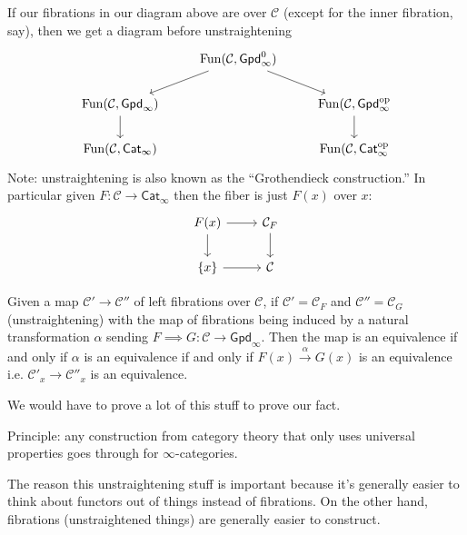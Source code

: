 \documentclass{amsart}
\DeclareMathOperator{\Fun}{Fun}
\begin{document}
If our fibrations in our diagram above are over $\mathcal{C}$ (except for the inner fibration, say),
then we get a diagram before unstraightening
\begin{equation*}
    \begin{tikzcd}
        & \Fun(\mathcal{C}, \mathsf{Gpd}_\infty^0)\ar[ld]\ar[rd] &\\
        \Fun(\mathcal{C}, \mathsf{Gpd}_\infty)\dar  & & \Fun(\mathcal{C},\mathsf{Gpd}_\infty^\text{op}\dar \\
        \Fun(\mathcal{C},\mathsf{Cat}_\infty) & & \Fun(\mathcal{C}, \mathsf{Cat}_\infty^\text{op}
    \end{tikzcd}
\end{equation*}
Note: unstraightening is also known as the ``Grothendieck construction.''
In particular given $F:\mathcal{C}\to \mathsf{Cat}_\infty$ then the fiber is just $F(x)$ over $x$:
\begin{equation*}
    \begin{tikzcd}
        F(x) \rar\dar & \mathcal{C}_F\dar \\
        \{x\} \rar & \mathcal{C}
    \end{tikzcd}
\end{equation*}
\begin{corollary}
    Given a map $\mathcal{C}'\to \mathcal{C}''$ of left fibrations over $\mathcal{C}$, if 
    $\mathcal{C}'=\mathcal{C}_F$ and $\mathcal{C}''=\mathcal{C}_G$ (unstraightening) with
    the map of fibrations being induced by a natural transformation $\alpha$ sending $F\implies G:\mathcal{C}\to \mathsf{Gpd}_\infty$.
    Then the map is an equivalence if and only if $\alpha$ is an equivalence if and only if
    $F(x)\xrightarrow{\alpha}G(x)$ is an equivalence i.e. $\mathcal{C}'_x\to \mathcal{C}''_x$
    is an equivalence.
\end{corollary}
We would have to prove a lot of this stuff to prove our fact.

Principle: any construction from category theory that only uses universal properties
goes through for $\infty$-categories. 

The reason this unstraightening stuff is important because it's generally easier to
think about functors out of things instead of fibrations. On the other hand,
fibrations (unstraightened things) are generally easier to construct.





\appendix


\newpage




\end{document}
